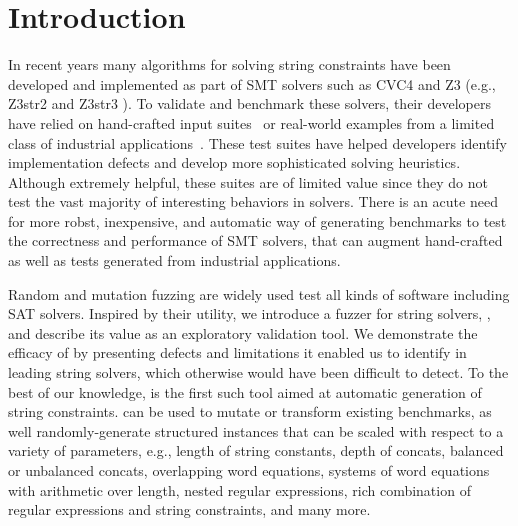 \section{Introduction}

In recent years many algorithms for solving string constraints have
been developed and implemented as part of SMT solvers such as CVC4
\cite{cvc4} and Z3 (e.g., Z3str2 \cite{z3str2} and Z3str3
\cite{z3str3}). To validate and benchmark these solvers, their
developers have relied on hand-crafted input
suites~\cite{cvc4-tests,z3str3-tests,z3str2-tests} or real-world
examples from a limited class of industrial
applications~\cite{kaluza,kausler}. These test suites have helped
developers identify implementation defects and develop more
sophisticated solving heuristics. Although extremely helpful, these
suites are of limited value since they do not test the vast majority
of interesting behaviors in solvers. There is an acute need for more
robst, inexpensive, and automatic way of generating benchmarks to test
the correctness and performance of SMT solvers, that can augment
hand-crafted as well as tests generated from industrial applications.

Random and mutation fuzzing are widely used test all kinds of software
including SAT solvers. Inspired by their utility, we introduce a
fuzzer for string solvers, \fuzzer{}, and describe its value as an
exploratory validation tool. We demonstrate the efficacy of \fuzzer{}
by presenting defects and limitations it enabled us to identify in
leading string solvers, which otherwise would have been difficult to
detect. To the best of our knowledge, \fuzzer{} is the first such tool
aimed at automatic generation of string constraints. \fuzzer{} can be
used to mutate or transform existing benchmarks, as well
randomly-generate structured instances that can be scaled with respect
to a variety of parameters, e.g., length of string constants, depth of
concats, balanced or unbalanced concats, overlapping word equations,
systems of word equations with arithmetic over length, nested regular
expressions, rich combination of regular expressions and string
constraints, and many more.


